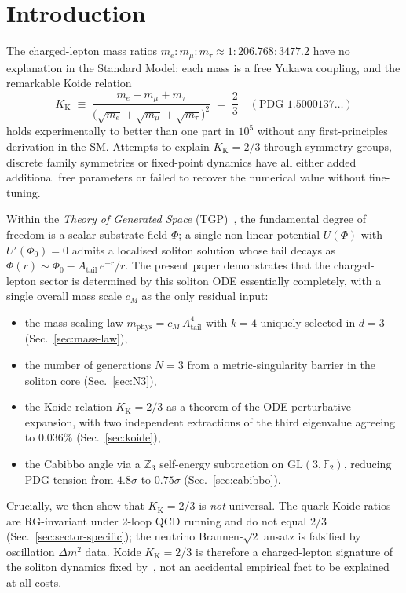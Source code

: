 \documentclass[11pt,a4paper]{article}
\renewcommand{\Phi}{\varPhi}
\newcommand{\PhiZero}{\varPhi_{0}}
\newcommand{\Atail}{A_{\mathrm{tail}}}
\newcommand{\mphys}{m_{\mathrm{phys}}}
\newcommand{\Kkoide}{K_{\mathrm{K}}}
\newcommand{\GLtf}{\mathrm{GL}(3,\mathbb{F}_{2})}
\newcommand{\Zthree}{\mathbb{Z}_{3}}
\begin{document}
\tableofcontents
\newpage

\section{Introduction}\label{sec:intro}

The charged-lepton mass ratios $m_{e}:m_{\mu}:m_{\tau}\approx
1:206.768:3477.2$ have no explanation in the Standard Model: each mass
is a free Yukawa coupling, and the remarkable Koide
relation~\cite{Koide1981,Koide1983,Brannen2006}
\begin{equation}\label{eq:koide-intro}
  \Kkoide \;\equiv\;
  \frac{m_{e}+m_{\mu}+m_{\tau}}{\bigl(\sqrt{m_{e}}+\sqrt{m_{\mu}}+\sqrt{m_{\tau}}\bigr)^{2}}
  \;=\; \frac{2}{3}
  \quad(\text{PDG } 1.5000137\ldots)
\end{equation}
holds experimentally to better than one part in $10^{5}$ without any
first-principles derivation in the SM. Attempts to explain $\Kkoide=2/3$
through symmetry groups, discrete family symmetries or fixed-point
dynamics have all either added additional free parameters or failed to
recover the numerical value without fine-tuning.

Within the \emph{Theory of Generated Space} (TGP)~\cite{TGP-core}, the
fundamental degree of freedom is a scalar substrate field $\Phi$; a
single non-linear potential $U(\Phi)$ with $U'(\PhiZero)=0$ admits a
localised soliton solution whose tail decays as $\Phi(r)\sim
\PhiZero-\Atail\,e^{-r}/r$. The present paper demonstrates that the
charged-lepton sector is determined by this soliton ODE essentially
completely, with a single overall mass scale $c_{M}$ as the only
residual input:
\begin{itemize}[leftmargin=1.4em,nosep]
\item the mass scaling law $\mphys=c_{M}\,\Atail^{4}$ with $k=4$
uniquely selected in $d=3$ (Sec.~\ref{sec:mass-law}),
\item the number of generations $N=3$ from a metric-singularity barrier
in the soliton core (Sec.~\ref{sec:N3}),
\item the Koide relation $\Kkoide=2/3$ as a theorem of the ODE
perturbative expansion, with two independent extractions of the third
eigenvalue agreeing to $0.036\%$ (Sec.~\ref{sec:koide}),
\item the Cabibbo angle via a $\Zthree$ self-energy subtraction on
$\GLtf$, reducing PDG tension from $4.8\sigma$ to $0.75\sigma$
(Sec.~\ref{sec:cabibbo}).
\end{itemize}
Crucially, we then show that $\Kkoide=2/3$ is \emph{not} universal.
The quark Koide ratios are RG-invariant under 2-loop QCD running and do
not equal $2/3$ (Sec.~\ref{sec:sector-specific}); the neutrino
Brannen-$\sqrt{2}$ ansatz is falsified by oscillation $\Delta m^{2}$
data. Koide $\Kkoide=2/3$ is therefore a charged-lepton signature of
the soliton dynamics fixed by~\cite{TGP-core}, not an accidental
empirical fact to be explained at all costs.
\end{document}
